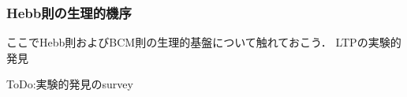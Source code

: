 \subsubsection{Hebb則の生理的機序}
ここでHebb則およびBCM則の生理的基盤について触れておこう．
LTPの実験的発見 \cite{Bliss1973-vj} \cite{Dudek1992-nz}

ToDo:実験的発見のsurvey
